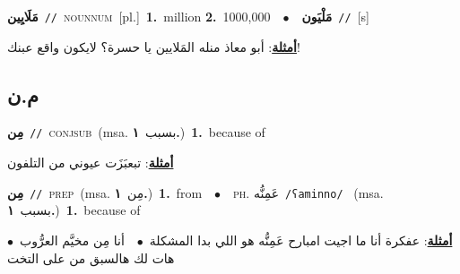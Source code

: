 \documentclass[10pt,a4paper,twoside]{article} %
\begin{document}
\begin{multicols}{2}
{\setlength\topsep{0pt}\textbf{\foreignlanguage{arabic}{مَلَايِين}}\ {\color{gray}\texttt{//}\color{black}}\ \textsc{noun\textunderscore num}\ [pl.]\ \textbf{1.}~million  \textbf{2.}~1000,000\ \ $\bullet$\ \ \setlength\topsep{0pt}\textbf{\foreignlanguage{arabic}{مَلْيَون}}\ {\color{gray}\texttt{//}\color{black}}\ [s]\  \begin{flushright}\color{gray}\foreignlanguage{arabic}{\textbf{\underline{\foreignlanguage{arabic}{أمثلة}}}: أبو معاذ منله المَلايين يا حسرة؟ لايكون واقع عبنك!}\end{flushright}\color{black}} \vspace{2mm}

\vspace{-3mm}
\subsection*{\color{blue}\foreignlanguage{arabic}{م.ن}\color{blue}{}} 

{\setlength\topsep{0pt}\textbf{\foreignlanguage{arabic}{مِن}}\ {\color{gray}\texttt{//}\color{black}}\ \textsc{conj\textunderscore sub}\ \color{gray}(msa. \foreignlanguage{arabic}{بسبب}~\foreignlanguage{arabic}{\textbf{١.}})\color{black}\ \textbf{1.}~because of\  \begin{flushright}\color{gray}\foreignlanguage{arabic}{\textbf{\underline{\foreignlanguage{arabic}{أمثلة}}}: تبعبَزَت عيوني من التلفون}\end{flushright}\color{black}} \vspace{2mm}

{\setlength\topsep{0pt}\textbf{\foreignlanguage{arabic}{مِن}}\ {\color{gray}\texttt{//}\color{black}}\ \textsc{prep}\ \color{gray}(msa. \foreignlanguage{arabic}{مِن}~\foreignlanguage{arabic}{\textbf{١.}})\color{black}\ \textbf{1.}~from\ \ $\bullet$\ \ \textsc{ph.} \color{gray} \foreignlanguage{arabic}{عَمِنُّه}\color{black}\ {\color{gray}\texttt{/{\sffamily ʕaminno}/}\color{black}}\ \color{gray} (msa. \foreignlanguage{arabic}{بسبب}~\foreignlanguage{arabic}{\textbf{١.}})\color{black}\ \textbf{1.}~because of\  \begin{flushright}\color{gray}\foreignlanguage{arabic}{\textbf{\underline{\foreignlanguage{arabic}{أمثلة}}}: عفكرة أنا ما اجيت امبارح عَمِنُّه هو اللي بدا المشكلة\ $\bullet$\ \  أنا مِن مخيَّم العرُّوب\ $\bullet$\ \  هات لك هالسبق من على التخت}\end{flushright}\color{black}} \vspace{2mm}


\end{multicols}
\end{document}
